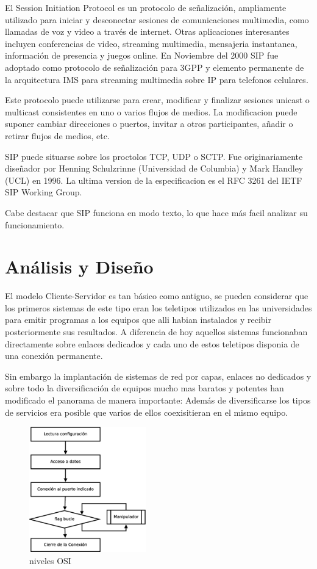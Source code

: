 \documentclass[a4paper,spanish,12pt]{book}
\begin{document}
El Session Initiation Protocol es un protocolo de señalización, ampliamente utilizado para iniciar y desconectar sesiones de comunicaciones multimedia, como llamadas de voz y video a trav\'es de internet. Otras aplicaciones interesantes incluyen conferencias de video, streaming multimedia, mensajeria instantanea, información de presencia y juegos online. En Noviembre del 2000 SIP fue adoptado como protocolo de señalización para 3GPP y elemento permanente de la arquitectura IMS para streaming multimedia sobre IP para telefonos celulares.

Este protocolo puede utilizarse para crear, modificar y finalizar sesiones unicast o multicast consistentes en uno o varios flujos de medios. La modificacion puede suponer cambiar direcciones o puertos, invitar a otros participantes, añadir o retirar flujos de medios, etc.

SIP puede situarse sobre los proctolos TCP, UDP o SCTP. Fue originariamente diseñador por Henning Schulzrinne (Universidad de Columbia) y Mark Handley (UCL) en 1996. La ultima version de la especificacion es el RFC 3261 del IETF SIP Working Group.

Cabe destacar que SIP funciona en modo texto, lo que hace más facil analizar su funcionamiento.

\chapter{Análisis y Diseño}
El modelo Cliente-Servidor es tan básico como antiguo, se pueden considerar que los primeros sistemas de este tipo eran los teletipos utilizados en las universidades para emitir programas a los equipos que alli habian instalados y recibir posteriormente sus resultados. A diferencia de hoy aquellos sistemas funcionaban directamente sobre enlaces dedicados y cada uno de estos teletipos disponia de una conexión permanente.

Sin embargo la implantación de sistemas de red por capas, enlaces no dedicados y sobre todo la diversificación de equipos mucho mas baratos y potentes han modificado el panorama de manera importante: Además de diversificarse los tipos de servicios era posible que varios de ellos coexisitieran en el mismo equipo.

\begin{figure}
	\includegraphics[width=0.45\textwidth]{img/FlujoServicio.eps}
              \caption{niveles OSI}
  \label{fig:nivelesOSI}
\end{figure}
\end{document}
